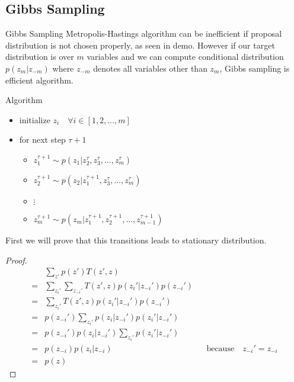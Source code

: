 \documentclass[pdf]{beamer}
\begin{document}
\subsection{Gibbs Sampling}
\begin{frame}{Gibbs Sampling}
  Metropolis-Hastings algorithm can be inefficient if proposal distribution is not chosen properly, as seen in demo. However if our target distribution is over $m$ variables and we can compute conditional distribution $p(z_m|z_{-m})$ where $z_{-m}$ denotes all variables other than $z_m$, Gibbs sampling is efficient algorithm.
  \pause

  \begin{block}{Algorithm}
    \begin{itemize}
    \item initialize $z_i \quad \forall i \in [1,2, \dots , m]$
    \item for next step $\tau + 1$
      \begin{itemize}
      \item $z_1^{\tau+1} \sim p(z_1 | z_2^\tau, z_3^\tau, \dots, z_m^\tau)$
      \item $z_2^{\tau+1} \sim p(z_2 | z_1^{\tau+1}, z_3^\tau, \dots, z_m^\tau)$

      \item[]{$\vdots$}

      \item $z_m^{\tau+1} \sim p(z_m | z_1^{\tau+1}, z_2^{\tau+1}, \dots, z_{m-1}^{\tau+1})$
      \end{itemize}
    \end{itemize}
  \end{block}
\end{frame}

\begin{frame}[shrink]
  First we will prove that this transitions leads to stationary distribution.

  \begin{proof}
    \begin{align*}
      &  \sum_{z'}p(z') T(z', z) \\
      =& \sum_{z_i'}  \sum_{z_{-i}'} T(z', z) p(z_i'|z_{-i}') p(z_{-i}')  \\
      =& \sum_{z_i'}  T(z', z) p(z_i'|z_{-i}') p(z_{-i}') \\
      =&  p(z_{-i}') \sum_{z_i'}  p(z_i|z_{-i}') p(z_i'|z_{-i}') \\
      =&  p(z_{-i}')  p(z_i|z_{-i}') \sum_{z_i'}  p(z_i'|z_{-i}') \\
      =&  p(z_{-i})  p(z_i|z_{-i})  && \text{because} \quad z_{-i}' = z_{-i} \\
      =& p(z)
    \end{align*}
  \end{proof}
\end{frame}
\end{document}
